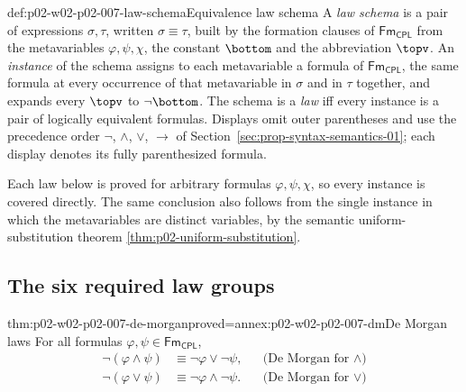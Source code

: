\begin{hbdefinition}{def:p02-w02-p02-007-law-schema}{Equivalence law schema}
A \emph{law schema} is a pair of expressions \(\sigma,\tau\), written
\(\sigma\equiv\tau\), built by the formation clauses of
\(\mathsf{Fm}_{\mathsf{CPL}}\) from the metavariables \(\varphi,\psi,\chi\),
the constant \(\bottom\) and the abbreviation \(\topv\).  An
\emph{instance} of the schema assigns to each metavariable a formula of
\(\mathsf{Fm}_{\mathsf{CPL}}\), the same formula at every occurrence of
that metavariable in \(\sigma\) and in \(\tau\) together, and expands every
\(\topv\) to \(\neg\bottom\).  The schema is a \emph{law} iff every instance
is a pair of logically equivalent formulas.  Displays omit outer parentheses
and use the precedence order \(\neg\), \(\land\), \(\lor\), \(\to\) of
Section~\ref{sec:prop-syntax-semantics-01}; each display denotes its fully
parenthesized formula.
\end{hbdefinition}

Each law below is proved for arbitrary formulas \(\varphi,\psi,\chi\), so
every instance is covered directly.  The same conclusion also follows from the
single instance in which the metavariables are distinct variables, by the
semantic uniform-substitution theorem \cref{thm:p02-uniform-substitution}.

\subsection{The six required law groups}
\label{sec:p02-w02-p02-007-six-laws}

\begin{hblemma}{thm:p02-w02-p02-007-de-morgan}{proved=annex:p02-w02-p02-007-dm}{De Morgan laws}
For all formulas \(\varphi,\psi\in\mathsf{Fm}_{\mathsf{CPL}}\),
\[
\begin{aligned}
 \neg(\varphi\land\psi)&\equiv\neg\varphi\lor\neg\psi,
   &&\text{(De Morgan for }\land\text{)}\\
 \neg(\varphi\lor\psi)&\equiv\neg\varphi\land\neg\psi.
   &&\text{(De Morgan for }\lor\text{)}
\end{aligned}
\]
\end{hblemma}

